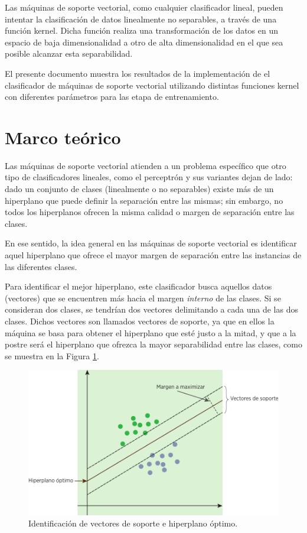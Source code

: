 \documentclass[spanish,12pt]{article}
\begin{document}
Las máquinas de soporte vectorial, como cualquier clasificador lineal,
pueden intentar la clasificación de datos linealmente no separables,
a través de una función kernel. Dicha función realiza una transformación
de los datos en un espacio de baja dimensionalidad a otro de alta
dimensionalidad en el que sea posible alcanzar esta separabilidad.

El presente documento muestra los resultados de la implementación
de el clasificador de máquinas de soporte vectorial utilizando distintas
funciones kernel con diferentes parámetros para las etapa de entrenamiento.

\section{Marco teórico}

Las máquinas de soporte vectorial atienden a un problema específico
que otro tipo de clasificadores lineales, como el perceptrón y sus
variantes dejan de lado: dado un conjunto de clases (linealmente o
no separables) existe más de un hiperplano que puede definir la separación
entre las mismas; sin embargo, no todos los hiperplanos ofrecen la
misma calidad o margen de separación entre las clases.

En ese sentido, la idea general en las máquinas de soporte vectorial
es identificar aquel hiperplano que ofrece el mayor margen de separación
entre las instancias de las diferentes clases. 

Para identificar el mejor hiperplano, este clasificador busca aquellos
datos (vectores) que se encuentren más hacia el margen \emph{interno}
de las clases. Si se consideran dos clases, se tendrían dos vectores
delimitando a cada una de las dos clases. Dichos vectores son llamados
vectores de soporte, ya que en ellos la máquina se basa para obtener
el hiperplano que esté justo a la mitad, y que a la postre será el
hiperplano que ofrezca la mayor separabilidad entre las clases, como
se muestra en la Figura \ref{fig:Identificacion-de-vectores}.

\begin{figure}
\begin{centering}
\includegraphics{imagenes/svm}
\par\end{centering}
\protect\caption{Identificación de vectores de soporte e hiperplano óptimo.\label{fig:Identificacion-de-vectores}}
\end{figure}
\end{document}
